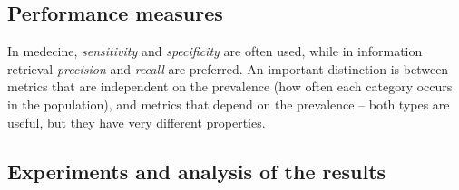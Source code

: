 \subsection{Performance measures}
In medecine, \emph{sensitivity} and \emph{specificity} are often used, 
while in information retrieval \emph{precision} and \emph{recall} are preferred.
An important distinction is between metrics that are independent on the prevalence
(how often each category occurs in the population), and metrics that depend on the
prevalence – both types are useful, but they have very different properties.

\subsection{Experiments and analysis of the results}

